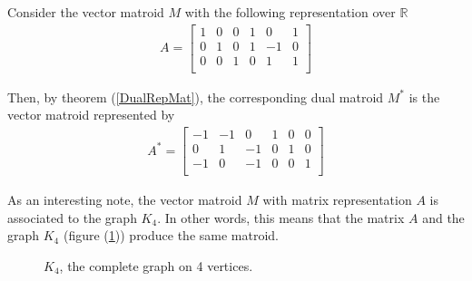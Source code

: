 \begin{exmp}
    Consider the vector matroid $M$ with the following representation over $\mathbb{R}$
    \begin{align*}
        A = \begin{bmatrix}
            1 & 0 & 0 & 1 & 0 & 1 \\
            0 & 1 & 0 & 1 & -1 & 0 \\
            0 & 0 & 1 & 0 & 1 & 1 \\
        \end{bmatrix}
    \end{align*}

Then, by theorem (\ref{DualRepMat}), the corresponding dual matroid $M^*$ is the vector matroid represented by 
\begin{align*}
        A^* = \begin{bmatrix}
            -1 & -1 & 0 & 1 & 0 & 0 \\
            0 & 1 & -1 & 0 & 1 & 0 \\
            -1 & 0 & -1 & 0 & 0 & 1 \\
        \end{bmatrix}
\end{align*}

As an interesting note, the vector matroid $M$ with matrix representation $A$ is associated to the graph $K_4$. In other words, this means that the matrix $A$ and the graph $K_4$ (figure (\ref{K4Graph})) produce the same matroid.

       \begin{figure}[H]
        \centering
            \caption{$K_4$, the complete graph on 4 vertices.}
            \label{K4Graph}
        \end{figure}


\end{exmp}
